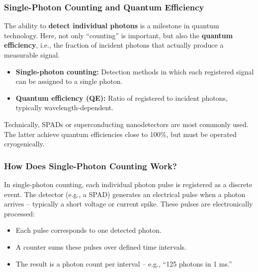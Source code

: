 \subsubsection{Single-Photon Counting and Quantum Efficiency}

The ability to \textbf{detect individual photons} is a milestone in quantum technology. Here, not only “counting” is important, but also the \textbf{quantum efficiency}, i.e., the fraction of incident photons that actually produce a measurable signal.
\vspace{1em}
\begin{tcolorbox}[physikbox, title=Physical Terms]
	\label{box:begriffe}
	\small
	\begin{itemize}
		\item \textbf{Single-photon counting:} Detection methods in which each registered signal can be assigned to a single photon.
		\item \textbf{Quantum efficiency (QE):} Ratio of registered to incident photons, typically wavelength-dependent.
	\end{itemize}
\end{tcolorbox}

Technically, SPADs or superconducting nanodetectors are most commonly used. The latter achieve quantum efficiencies close to 100\%, but must be operated cryogenically.
\newpage
\noindent
\subsubsection*{How Does Single-Photon Counting Work?}
In single-photon counting, each individual photon pulse is registered as a discrete event. The detector (e.g., a SPAD) generates an electrical pulse when a photon arrives – typically a short voltage or current spike. These pulses are electronically processed:

\begin{itemize}
	\item Each pulse corresponds to one detected photon.
	\item A counter sums these pulses over defined time intervals.
	\item The result is a photon count per interval – e.g., “125 photons in 1 ms.”
\end{itemize}

